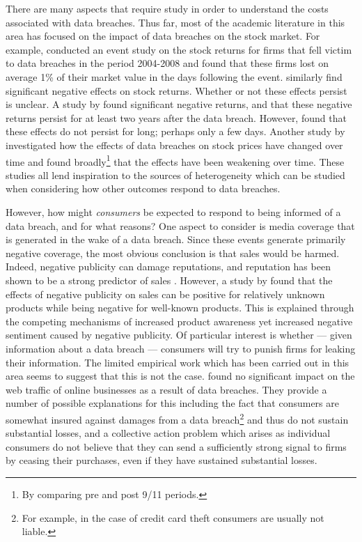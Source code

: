 \documentclass[../Main.tex]{subfiles}
\begin{document}
There are many aspects that require study in order to understand the costs associated with data breaches. Thus far, most of the academic literature in this area has focused on the impact of data breaches on the stock market. For example, \cite{goel2009} conducted an event study on the stock returns for firms that fell victim to data breaches in the period 2004-2008 and found that these firms lost on average 1\% of their market value in the days following the event. \cite{rosati2019} similarly find significant negative effects on stock returns. Whether or not these effects persist is unclear. A study by \cite{morse2011} found significant negative returns, and that these negative returns persist for at least two years after the data breach. However, \cite{acquisti2006} found that these effects do not persist for long; perhaps only a few days. Another study by \cite{gordon2011} investigated how the effects of data breaches on stock prices have changed over time and found broadly\footnote{By comparing pre and post 9/11 periods.} that the effects have been weakening over time. These studies all lend inspiration to the sources of heterogeneity which can be studied when considering how other outcomes respond to data breaches.

However, how might \textit{consumers} be expected to respond to being informed of a data breach, and for what reasons? One aspect to consider is media coverage that is generated in the wake of a data breach. Since these events generate primarily negative coverage, the most obvious conclusion is that sales would be harmed. Indeed, negative publicity can damage reputations, and reputation has been shown to be a strong predictor of sales \citep{livingston2005}. However, a study by \cite{berger2010} found that the effects of negative publicity on sales can be positive for relatively unknown products while being negative for well-known products. This is explained through the competing mechanisms of increased product awareness yet increased negative sentiment caused by negative publicity. Of particular interest is whether --- given information about a data breach --- consumers will try to punish firms for leaking their information. The limited empirical work which has been carried out in this area seems to suggest that this is not the case. \cite{davis2009} found no significant impact on the web traffic of online businesses as a result of data breaches. They provide a number of possible explanations for this including the fact that consumers are somewhat insured against damages from a data breach\footnote{For example, in the case of credit card theft consumers are usually not liable.} and thus do not sustain substantial losses, and a collective action problem which arises as individual consumers do not believe that they can send a sufficiently strong signal to firms by ceasing their purchases, even if they have sustained substantial losses. 
\end{document}
